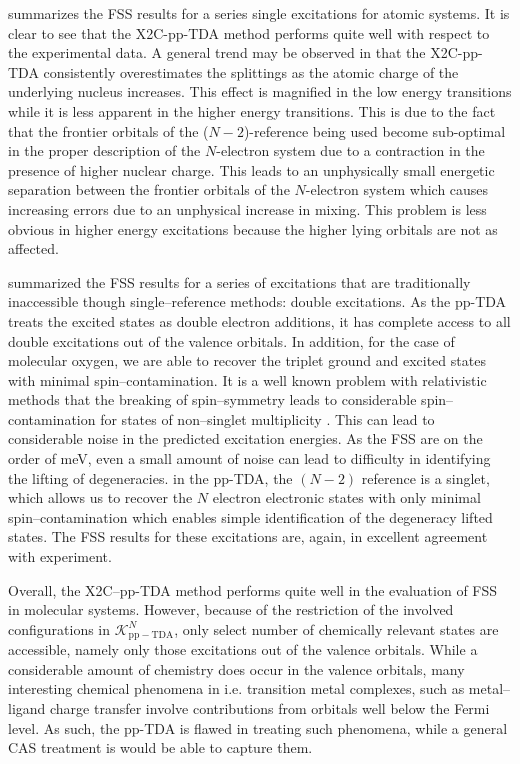  summarizes the FSS results for a series single excitations
for atomic systems. It is clear to see that the X2C-pp-TDA method performs quite
well with respect to the experimental data. A general trend may be observed in
that the X2C-pp-TDA consistently overestimates the splittings as the atomic
charge of the underlying nucleus increases. This effect is magnified in the low
energy transitions while it is less apparent in the higher energy transitions.
This is due to the fact that the frontier orbitals of the ($N-2$)-reference
being used become sub-optimal in the proper description of the $N$-electron
system due to a contraction in the presence of higher nuclear charge. This leads
to an unphysically small energetic separation between the frontier orbitals of
the $N$-electron system which causes increasing errors due to an unphysical
increase in mixing. This problem is less obvious in higher energy excitations
because the higher lying orbitals are not as affected.

 summarized the FSS results for a series of excitations that
are traditionally inaccessible though single--reference methods: double
excitations.  As the pp-TDA treats the excited states as double electron
additions, it has complete access to all double excitations out of the valence
orbitals. In addition, for the case of molecular oxygen, we are able to recover
the triplet ground and excited states with minimal spin--contamination. It is a
well known problem with relativistic methods that the breaking of spin--symmetry
leads to considerable spin--contamination for states of non--singlet
multiplicity . This can lead to considerable noise in the predicted excitation
energies. As the FSS are on the order of meV, even a small amount of noise can
lead to difficulty in identifying the lifting of degeneracies. in the pp-TDA, the
$(N-2)$ reference is a singlet, which allows us to recover the $N$ electron
electronic states with only minimal spin--contamination which enables simple
identification of the degeneracy lifted states. The FSS results for these
excitations are, again, in excellent agreement with experiment.

Overall, the X2C--pp-TDA method performs quite well in the evaluation of FSS in
molecular systems. However, because of the restriction of the involved
configurations in $\mathcal{K}_\mathrm{pp-TDA}^N$, only select number of
chemically relevant states are accessible, namely only those excitations out of
the valence orbitals. While a considerable amount of chemistry does occur in the
valence orbitals, many interesting chemical phenomena in i.e. transition metal
complexes, such as metal--ligand charge transfer involve contributions from
orbitals well below the Fermi level. As such, the pp-TDA is flawed in treating
such phenomena, while a general CAS treatment is would be able to capture them.
